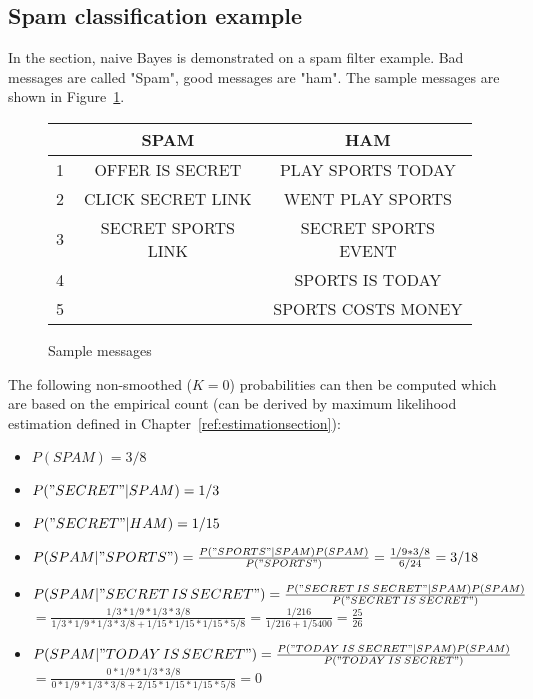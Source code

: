 \documentclass{report}
\begin{document}
\subsection{Spam classification example}
In the section, naive Bayes is demonstrated on a spam filter example. Bad messages are called "Spam", good messages are "ham". The sample messages are shown in Figure~\ref{ref:spamsample}.

\begin{figure}[h!]
\centering
\begin{tabular}{c||c|c}
& SPAM & HAM \\
\hline
\hline
1 & OFFER IS SECRET & PLAY SPORTS TODAY \\
2 & CLICK SECRET LINK & WENT PLAY SPORTS \\
3 & SECRET SPORTS LINK & SECRET SPORTS EVENT \\
4 & & SPORTS IS TODAY \\
5 & & SPORTS COSTS MONEY \\
\end{tabular}
\caption{Sample messages}
\label{ref:spamsample}
\end{figure}

The following non-smoothed ($K=0$) probabilities can then be computed which are based on the empirical count (can be derived by maximum likelihood estimation defined in Chapter~\ref{ref:estimationsection}):
\begin{itemize}
\item $P(SPAM) = 3/8$
\item $P("SECRET"\vert SPAM) = 1/3$
\item $P("SECRET"\vert HAM) = 1/15$
\item $P(SPAM\vert "SPORTS") = \frac{P("SPORTS"\vert SPAM)P(SPAM)}{P("SPORTS")}=\frac{1/9 * 3/8}{6/24}=3/18$
\item $P(SPAM\vert "SECRET\,IS\,SECRET")= \frac{P("SECRET\:IS\:SECRET"\vert SPAM)P(SPAM)}{P("SECRET\:IS\:SECRET")}$\\
$=\frac{1/3*1/9*1/3*3/8}{1/3*1/9*1/3*3/8+1/15*1/15*1/15*5/8}=\frac{1/216}{1/216+1/5400}=\frac{25}{26}$
\item $P(SPAM\vert "TODAY\,IS\,SECRET")= \frac{P("TODAY\:IS\:SECRET"\vert SPAM)P(SPAM)}{P("TODAY\:IS\:SECRET")}$\\
$=\frac{0*1/9*1/3*3/8}{0*1/9*1/3*3/8+2/15*1/15*1/15*5/8}=0$
\end{itemize}
\end{document}
